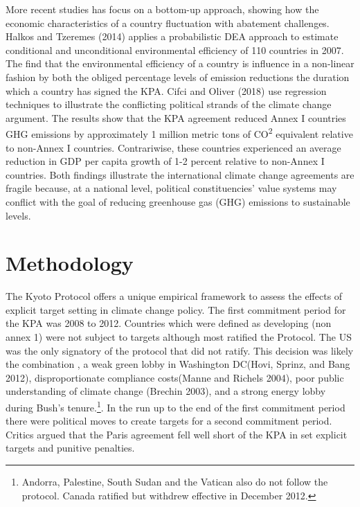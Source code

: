 \documentclass[
  10pt,
]{article}
\begin{document}
More recent studies has focus on a bottom-up approach, showing how the
economic characteristics of a country fluctuation with abatement
challenges. Halkos and Tzeremes (2014) applies a probabilistic DEA
approach to estimate conditional and unconditional environmental
efficiency of 110 countries in 2007. The find that the environmental
efficiency of a country is influence in a non-linear fashion by both the
obliged percentage levels of emission reductions the duration which a
country has signed the KPA. Cifci and Oliver (2018) use regression
techniques to illustrate the conflicting political strands of the
climate change argument. The results show that the KPA agreement reduced
Annex I countries GHG emissions by approximately 1 million metric tons
of CO\textsuperscript{2} equivalent relative to non-Annex I countries.
Contrariwise, these countries experienced an average reduction in GDP
per capita growth of 1-2 percent relative to non-Annex I countries. Both
findings illustrate the international climate change agreements are
fragile because, at a national level, political constituencies' value
systems may conflict with the goal of reducing greenhouse gas (GHG)
emissions to sustainable levels.

\hypertarget{methodology}{%
\section{Methodology}\label{methodology}}

The Kyoto Protocol offers a unique empirical framework to assess the
effects of explicit target setting in climate change policy. The first
commitment period for the KPA was 2008 to 2012. Countries which were
defined as developing (non annex 1) were not subject to targets although
most ratified the Protocol. The US was the only signatory of the
protocol that did not ratify. This decision was likely the combination ,
a weak green lobby in Washington DC(Hovi, Sprinz, and Bang 2012),
disproportionate compliance costs(Manne and Richels 2004), poor public
understanding of climate change (Brechin 2003), and a strong energy
lobby during Bush's tenure.\footnote{Andorra, Palestine, South Sudan and
  the Vatican also do not follow the protocol. Canada ratified but
  withdrew effective in December 2012.}. In the run up to the end of the
first commitment period there were political moves to create targets for
a second commitment period. Critics argued that the Paris agreement fell
well short of the KPA in set explicit targets and punitive penalties.
\end{document}
